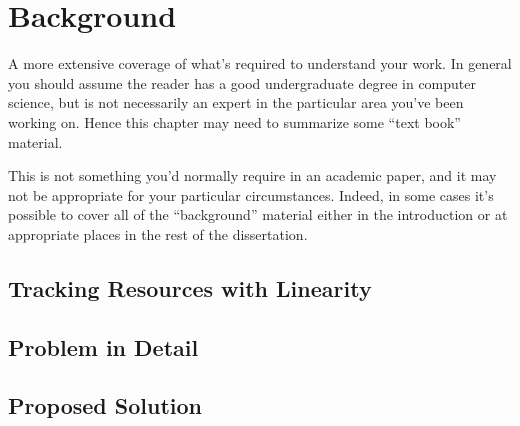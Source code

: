 \chapter{Background}

\begin{guidance}
    A more extensive coverage of what's required to understand your
    work. In general you should assume the reader has a good undergraduate
    degree in computer science, but is not necessarily an expert in
    the particular area you've been working on. Hence this chapter
    may need to summarize some ``text book'' material.

    This is not something you'd normally require in an academic paper,
    and it may not be appropriate for your particular circumstances.
    Indeed, in some cases it's possible to cover all of the ``background''
    material either in the introduction or at appropriate places in
    the rest of the dissertation.

\end{guidance}

\section{Tracking Resources with Linearity}

\section{Problem in Detail}

\section{Proposed Solution}
